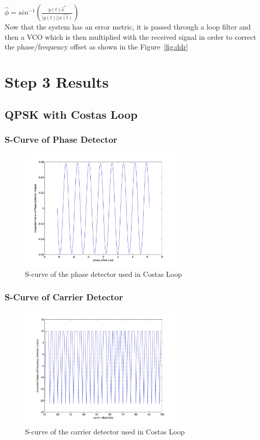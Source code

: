 \documentclass[]{article}
\begin{document}
$\hat{\phi} = sin^{-1}\left(\frac{y(t)\hat{x}^*}{|y(t)||\hat{x(t)}}\right)  $\\

Now that the system has an error metric, it is passed through a loop filter and then a VCO which is then multiplied with the received signal in order to correct the phase/frequency offset as shown in the Figure~\ref{fig:ddr}




\newpage
\section{Step 3 Results}
\subsection{QPSK with Costas Loop}

\subsubsection{S-Curve of Phase Detector}
\begin{figure}[H]
\centering
\hspace*{-2cm}\includegraphics[width=0.7\textwidth]{qpScurvepo_costas.jpg}
\caption{S-curve of the phase detector used in Costas Loop}
\end{figure}
\subsubsection{S-Curve of Carrier Detector}
\begin{figure}[H]
\centering
\hspace*{-2cm}\includegraphics[width=0.7\textwidth]{qpScurvefo.jpg}
\caption{S-curve of the carrier detector used in Costas Loop}
\end{figure}
\end{document}
